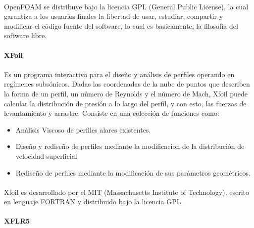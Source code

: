 \documentclass[letterpaper, openright, 12pt]{book}
\begin{document}
            \paragraph*{}
                OpenFOAM se distribuye bajo la licencia GPL (General Public
                License), la cual garantiza a los usuarios finales la libertad
                de usar, estudiar, compartir y modificar el código fuente del
                software, lo cual es basicamente, la filosofía del software
                libre.

            \paragraph*{XFoil}
            \paragraph*{}
                Es un programa interactivo para el diseño y análisis de perfiles
                operando en regímenes subsónicos. Dadas las coordenadas de la
                nube de puntos que describen la forma de un perfil, un número de
                Reynolds y el número de Mach, Xfoil puede calcular la
                distribución de presión a lo largo del perfil, y con esto,
                las fuerzas de levantamiento y arrastre.
                    Consiste en una colección de funciones como:
                    \begin{itemize}
                        \item Análisis Viscoso de perfiles alares existentes.
                        \item Diseño y rediseño de perfiles mediante la
                            modificacion de la distribución de velocidad
                            superficial
                        \item Rediseño de perfiles mediante la modificación de
                            sus parámetros geométricos.
                    \end{itemize}
                    \cite{xfoil}
            \paragraph*{}
                Xfoil es desarrollado por el MIT (Massachusetts Institute of
                Technology), escrito en lenguaje FORTRAN y distribuido bajo
                la licencia GPL.

            \paragraph*{XFLR5}
\end{document}
